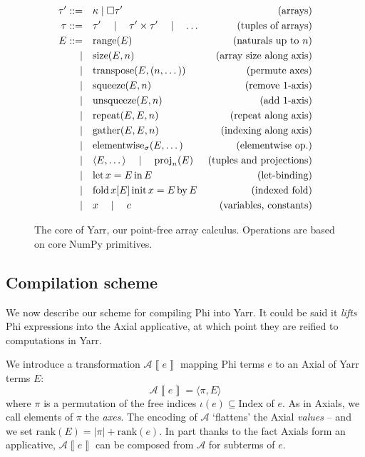 \begin{figure}[h]
    \centering
    \begin{align*}
    \tau' ::=& \quad\kappa \mid \Box \tau' &\text{(arrays)} \\
    \tau ::=& \quad\tau' \quad\mid\quad \tau' \times \tau' \quad\mid\quad \dots &\text{(tuples of arrays)} \\
    E ::=&\quad \mathrm{range}(E)   &\text{(naturals up to }n\text{)} \\
    \mid&\quad \mathrm{size}(E, n)  &\text{(array size along axis)} \\
    \mid&\quad \mathrm{transpose}(E, (n, \dots)) &\text{(permute axes)} \\ 
    \mid&\quad \mathrm{squeeze}(E, n) &\text{(remove 1-axis)} \\
    \mid&\quad \mathrm{unsqueeze}(E, n) &\text{(add 1-axis)} \\
    \mid&\quad \mathrm{repeat}(E, E, n) &\text{(repeat along axis)} \\
    \mid&\quad \mathrm{gather}(E, E, n) &\text{(indexing along axis)} \\ 
    \mid&\quad \mathrm{elementwise}_\sigma(E, \dots) &\text{(elementwise op.)} \\
    \mid&\quad \langle E, \dots \rangle \quad\mid\quad \mathrm{proj}_n(E) &\text{(tuples and projections)} \\
    \mid&\quad \mathrm{let}\,{x}={E}\,\mathrm{in}\,{E} &\text{(let-binding)} \\
    \mid&\quad \mathrm{fold}\,{x}[{E}]\,\mathrm{init}\,{x} = {E}\,\mathrm{by}\,{E} &\text{(indexed fold)} \\
    \mid&\quad x \quad\mid\quad c  &\text{(variables, constants)}
    \end{align*}
    \caption{The core of Yarr, our point-free array calculus. Operations are based on core NumPy primitives.}
    \label{fig:yarr-definition}
\end{figure}

\needspace{10em}
\subsection{Compilation scheme}

\newcommand{\denot}[1]{\left\llbracket{#1}\right\rrbracket}

We now describe our scheme for compiling Phi into Yarr. It could be said it \textit{lifts} Phi expressions into the Axial applicative, at which point they are reified to computations in Yarr.

We introduce a transformation $\mathcal A \denot{e}$ mapping Phi terms $e$ to an Axial of Yarr terms $E$:
$$ \mathcal A \denot{e} = \langle \pi, E \rangle $$
where $\pi$ is a permutation of the free indices $\iota(e) \subseteq \mathrm{Index}$ of $e$. As in Axials, we call elements of $\pi$ the \textit{axes}. The encoding of $\mathcal A$ `flattens' the Axial \textit{values} -- and we set $\mathrm{rank}(E) = |\pi| + \mathrm{rank}(e)$. In part thanks to the fact Axials form an applicative, $\mathcal A \denot{e}$ can be composed from $\mathcal A$ for subterms of $e$. 

